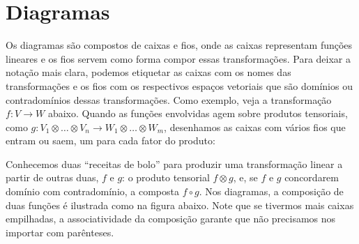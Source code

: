 \documentclass[11pt]{article}
\begin{document}
\section{Diagramas}
\label{sec:diagramas}
Os diagramas são compostos de caixas e fios, onde as caixas representam funções lineares e os fios servem como forma compor essas transformações. Para deixar a notação mais clara, podemos etiquetar as caixas com os nomes das transformações e os fios com os respectivos espaços vetoriais que são domínios ou contradomínios dessas transformações. Como exemplo, veja a transformação \(f:V\to W\) abaixo. Quando as funções envolvidas agem sobre produtos tensoriais, como \(g:V_1\otimes\dots\otimes V_n\to W_1\otimes\dots\otimes W_m\), desenhamos as caixas com vários fios que entram ou saem, um para cada fator do produto:


Conhecemos duas ``receitas de bolo'' para produzir uma transformação linear a partir de outras duas, \(f\) e \(g\): o produto tensorial \(f \otimes g\), e, se \(f\) e \(g\) concordarem domínio com contradomínio, a composta \(f\circ g\). Nos diagramas, a composição de duas funções é ilustrada como na figura abaixo. Note que se tivermos mais caixas empilhadas, a associatividade da composição garante que não precisamos nos importar com parênteses.

\end{document}
